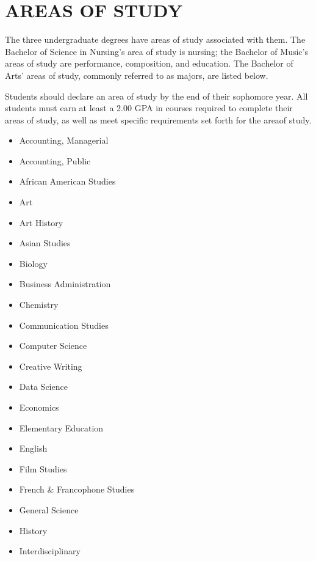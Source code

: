 \documentclass[
  letterpaper,
]{scrbook}
\providecommand{\tightlist}{%
  \setlength{\itemsep}{0pt}\setlength{\parskip}{0pt}}
\begin{document}
\hypertarget{sec-areas-of-study}{%
\chapter{AREAS OF STUDY}\label{sec-areas-of-study}}

The three undergraduate degrees have areas of study associated with
them. The Bachelor of Science in Nursing's area of study is nursing; the
Bachelor of Music's areas of study are performance, composition, and
education. The Bachelor of Arts' areas of study, commonly referred to as
majors, are listed below.

Students should declare an area of study by the end of their sophomore
year. All students must earn at least a 2.00 GPA in courses required to
complete their areas of study, as well as meet specific requirements set
forth for the areaof study.

\begin{itemize}
\tightlist
\item
  Accounting, Managerial
\item
  Accounting, Public
\item
  African American Studies
\item
  Art
\item
  Art History
\item
  Asian Studies
\item
  Biology
\item
  Business Administration
\item
  Chemistry
\item
  Communication Studies
\item
  Computer Science
\item
  Creative Writing
\item
  Data Science
\item
  Economics
\item
  Elementary Education
\item
  English
\item
  Film Studies
\item
  French \& Francophone Studies
\item
  General Science
\item
  History
\item
  Interdisciplinary
\end{itemize}
\end{document}

